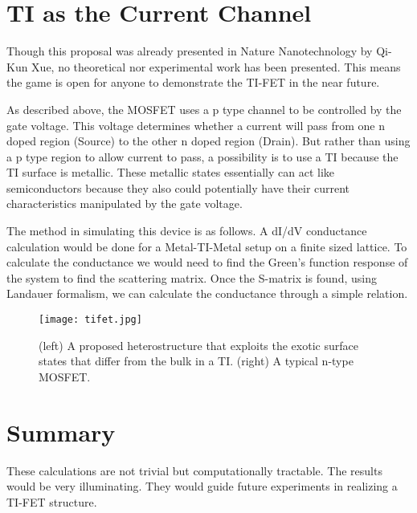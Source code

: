 \documentclass[11pt,revtex,aps]{report}
\begin{document}
\section{TI as the Current Channel}
Though this proposal was already presented in Nature Nanotechnology by Qi-Kun Xue, no theoretical nor experimental work has been presented. This means the game is open for anyone to demonstrate the TI-FET in the near future.

As described above, the MOSFET uses a p type channel to be controlled by the gate voltage. This voltage determines whether a current will pass from one n doped region (Source) to the other n doped region (Drain). But rather than using a p type region to allow current to pass, a possibility is to use a TI because the TI surface is metallic. These metallic states essentially can act like semiconductors because they also could potentially have their current characteristics manipulated by the gate voltage. 

The method in simulating this device is as follows. A dI/dV conductance calculation would be done for a Metal-TI-Metal setup on a finite sized lattice. To calculate the conductance we would need to find the Green's function response of the system to find the scattering matrix. Once the S-matrix is found, using Landauer formalism, we can calculate the conductance through a simple relation. 

\begin{figure}[h]
\center
\texttt{[image: tifet.jpg]}
\caption{(left) A proposed heterostructure that exploits the exotic surface states that differ from the bulk in a TI. (right) A typical n-type MOSFET.
}\label{tifet}
\end{figure}

\section{Summary}
These calculations are not trivial but computationally tractable. The results would be very illuminating. They would guide future experiments in realizing a TI-FET structure.





{}
\end{document}
